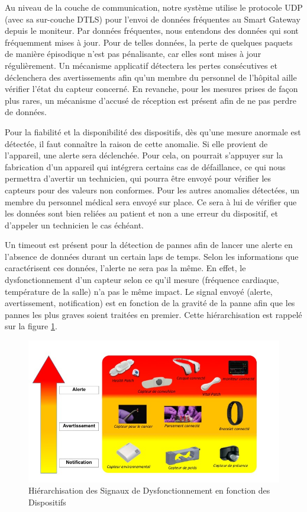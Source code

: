 Au niveau de la couche de communication, notre système utilise le protocole UDP (avec sa sur-couche DTLS) pour l’envoi de données fréquentes au Smart Gateway depuis le moniteur. Par données fréquentes, nous entendons des données qui sont fréquemment mises à jour. Pour de telles données, la perte de quelques paquets de manière épisodique n’est pas pénalisante, car elles sont mises à jour régulièrement. Un mécanisme applicatif détectera les pertes consécutives et déclenchera des avertissements afin qu’un membre du personnel de l’hôpital aille vérifier l’état du capteur concerné. En revanche, pour les mesures prises de façon plus rares, un mécanisme d’accusé de réception est présent afin de ne pas perdre de données.

Pour la fiabilité et la disponibilité des dispositifs, dès qu’une mesure anormale est détectée, il faut connaître la raison de cette anomalie. Si elle provient de l’appareil, une alerte sera déclenchée. Pour cela, on pourrait s’appuyer sur la fabrication d’un appareil qui intégrera certains cas de défaillance, ce qui nous permettra d’avertir un technicien, qui pourra être envoyé pour vérifier les capteurs pour des valeurs non conformes. Pour les autres anomalies détectées, un membre du personnel médical sera envoyé sur place. Ce sera à lui de vérifier que les données sont bien reliées au patient et non a une erreur du dispositif, et d’appeler un technicien le cas échéant.

Un timeout est présent pour la détection de pannes afin de lancer une alerte en l’absence de données durant un certain laps de temps. Selon les informations que caractérisent ces données, l’alerte ne sera pas la même. En effet, le dysfonctionnement d’un capteur selon ce qu’il mesure (fréquence cardiaque, température de la salle) n’a pas le même impact. Le signal envoyé (alerte, avertissement, notification) est en fonction de la gravité de la panne afin que les pannes les plus graves soient traitées en premier. Cette hiérarchisation est rappelé sur la figure \ref{alerte}.
\newline
\begin{figure}[h!]
	\hspace*{-2.5cm}
	\centering
	\includegraphics[width=1.4\textwidth]{alerte.jpg}
	\caption{Hiérarchisation des Signaux de Dysfonctionnement en fonction des Dispositifs}
	\label{alerte}
\end{figure}


